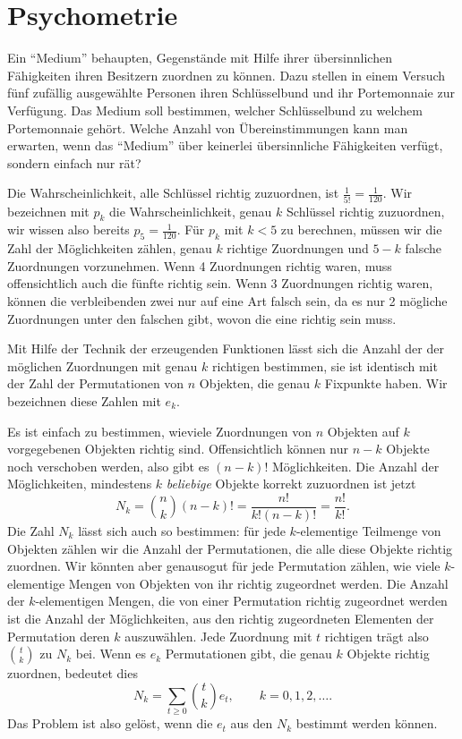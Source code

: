 \section{Psychometrie}
Ein ``Medium'' behaupten, Gegenstände mit Hilfe ihrer übersinnlichen Fähigkeiten
ihren Besitzern zuordnen zu können.
Dazu stellen in einem Versuch fünf
zufällig ausgewählte Personen ihren Schlüsselbund und ihr Portemonnaie zur
Ver\-fügung.
Das Medium soll bestimmen, welcher Schlüsselbund zu welchem
Portemonnaie gehört.
Welche Anzahl von Übereinstimmungen kann man erwarten, wenn das ``Medium''
über keinerlei übersinnliche Fähigkeiten verfügt, sondern einfach nur rät?

Die Wahrscheinlichkeit, alle Schlüssel richtig zuzuordnen, ist $\frac1{5!}=\frac1{120}$.
Wir bezeichnen mit $p_k$ die Wahrscheinlichkeit, genau $k$ Schlüssel richtig zuzuordnen,
wir wissen also bereits $p_5=\frac1{120}$.
Für $p_k$ mit $k<5$ zu berechnen, 
müssen wir die Zahl der Möglichkeiten zählen, genau $k$ richtige Zuordnungen
und $5-k$ falsche Zuordnungen vorzunehmen.
Wenn 4 Zuordnungen richtig waren,
muss offensichtlich auch die fünfte richtig sein.
Wenn 3 Zuordnungen richtig waren,
können die verbleibenden zwei nur auf eine Art falsch sein, da es nur 2 mögliche
Zuordnungen unter den falschen gibt, wovon die eine richtig sein muss.

Mit Hilfe der Technik der erzeugenden Funktionen lässt sich die Anzahl der
der möglichen Zuordnungen mit genau $k$ richtigen bestimmen, sie ist identisch
mit der Zahl der Permutationen von $n$ Objekten, die genau $k$ Fixpunkte haben.
Wir bezeichnen diese Zahlen mit $e_k$.

Es ist einfach zu bestimmen, wieviele Zuordnungen von $n$ Objekten auf $k$
vorgegebenen Objekten richtig sind.
Offensichtlich können nur $n-k$ Objekte
noch verschoben werden, also gibt es $(n-k)!$ Möglichkeiten.
Die Anzahl der Möglichkeiten, mindestens $k$ {\it beliebige} Objekte korrekt
zuzuordnen ist jetzt
$$N_k=\binom{n}{k}(n-k)!=\frac{n!}{k!(n-k)!}=\frac{n!}{k!}.$$
Die Zahl $N_k$ lässt sich auch so bestimmen: für jede $k$-elementige
Teilmenge von Objekten zählen wir die Anzahl der Permutationen, die 
alle diese Objekte richtig zuordnen.
Wir könnten aber genausogut
für jede Permutation zählen, wie viele $k$-elementige Mengen von Objekten
von ihr richtig zugeordnet werden.
Die Anzahl der $k$-elementigen Mengen,
die von einer Permutation richtig zugeordnet werden ist die Anzahl der
Möglichkeiten, aus den richtig zugeordneten Elementen der Permutation
deren $k$ auszuwählen.
Jede Zuordnung mit $t$ richtigen trägt also
$\binom{t}{k}$ zu $N_k$ bei.
Wenn es $e_k$ Permutationen gibt,
die genau $k$ Objekte richtig zuordnen, bedeutet dies
$$N_k=\sum_{t\ge 0}\binom{t}{k}e_t,\qquad k=0,1,2,\dots.$$
Das Problem ist also gelöst, wenn die $e_t$ aus den $N_k$ bestimmt werden können.


